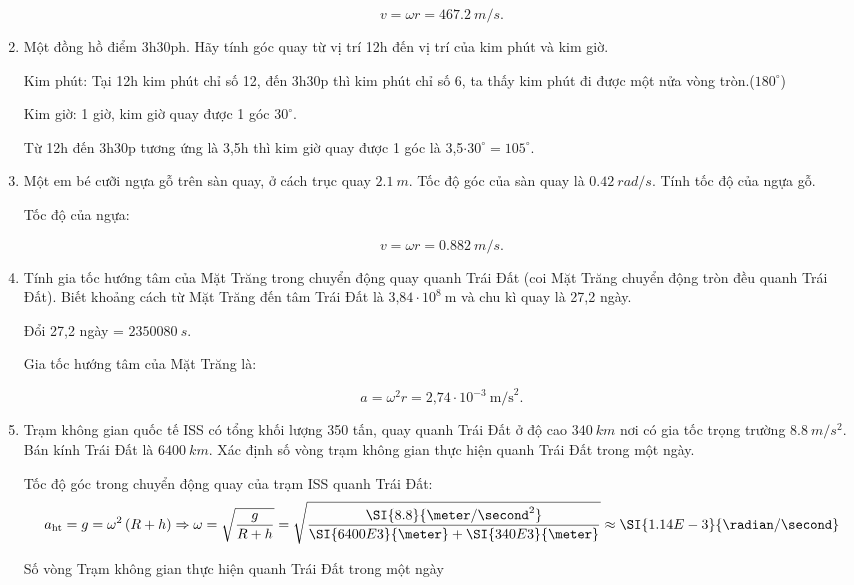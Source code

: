 \begin{enumerate}[label=\bfseries Câu \arabic*:, leftmargin=1.5cm]
{		$$v = \omega r = \SI{467,2}{m/s}.$$
	}
	\item {}
	
	
	{
		Một đồng hồ điểm 3h30ph. Hãy tính góc quay từ vị trí 12h đến vị trí của kim phút và kim giờ. 
	}
	
	\hideall
	{	
		Kim phút: Tại 12h kim phút chỉ số 12, đến 3h30p thì kim phút chỉ số 6, ta thấy kim phút đi được một nửa vòng tròn.($180^\circ$)
		
		Kim giờ: 1 giờ, kim giờ quay được 1 góc $30^\circ$. 
		
		Từ 12h đến 3h30p tương ứng là 3,5h thì kim giờ quay được 1 góc là 3,5$\cdot 30^\circ = 105^\circ.$
		
		
	}
	\item {}
	
	
	{
		Một em bé cưỡi ngựa gỗ trên sàn quay, ở cách trục quay $\SI{2,1}{m}$. Tốc độ góc của sàn quay là $\SI{0,42}{rad/s}$. Tính tốc độ của ngựa gỗ.
	}
	
	\hideall
	{	
		Tốc độ của ngựa:
		
		$$v = \omega r = \SI{0,882}{m/s}.$$
	}

\item {}


{
	Tính gia tốc hướng tâm của Mặt Trăng trong chuyển động quay quanh Trái Đất (coi Mặt Trăng chuyển động tròn đều quanh Trái Đất). Biết khoảng cách từ Mặt Trăng đến tâm Trái Đất là $\text{3,84}\cdot 10^8\ \text{m}$ và chu kì quay là 27,2 ngày.
}

\hideall
{	
	Đổi 27,2 ngày = $\SI{2 350 080}{s}.$
	
	Gia tốc hướng tâm của Mặt Trăng là:
	
	$$a = \omega^2 r = \text{2,74}\cdot 10^{-3}\ \text{m/s}^2.$$
}


\item {}


{
	Trạm không gian quốc tế ISS có tổng khối lượng 350 tấn, quay quanh Trái Đất ở độ cao $\SI{340}{km}$ nơi có gia tốc trọng trường $\SI{8,8}{m/s^2}$. Bán kính Trái Đất là $\SI{6400}{km}$. Xác định số vòng trạm không gian thực hiện quanh Trái Đất trong một ngày.
}
\hideall
{	Tốc độ góc trong chuyển động quay của trạm ISS quanh Trái Đất:
	$$a_\text{ht}=g=\omega^2\left(R+h\right)\Rightarrow \omega=\sqrt{\dfrac{g}{R+h}}=\sqrt{\dfrac{\SI{8.8}{\meter/\second^2}}{\SI{6400E3}{\meter}+\SI{340E3}{\meter}}}\approx\SI{1.14E-3}{\radian/\second}$$
		
		Số vòng Trạm không gian thực hiện quanh Trái Đất trong một ngày
		
}
\end{enumerate}
